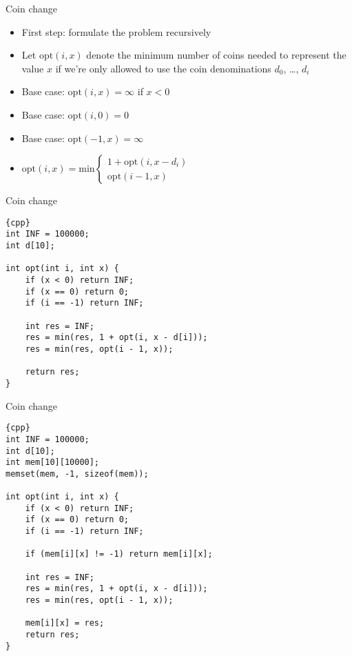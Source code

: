 \begin{frame}[fragile]{Coin change}
    \begin{itemize}
        \item First step: formulate the problem recursively
\item Let $\mathrm{opt}(i,x)$ denote the minimum number of coins needed to represent the value $x$ if we're only allowed to use the coin denominations $d_0$, \ldots, $d_i$
        \item Base case: $\mathrm{opt}(i,x) = \infty$ if $x < 0$
        \item Base case: $\mathrm{opt}(i,0) = 0$
        \item Base case: $\mathrm{opt}(-1,x) = \infty$
\item $\mathrm{opt}(i,x) = \mathrm{min} \left\{
	\begin{array}{l}
        1 + \mathrm{opt}(i, x - d_i) \\
        \mathrm{opt}(i-1, x)
	\end{array}
\right.$
    \end{itemize}
\end{frame}

\begin{frame}[fragile]{Coin change}
    \begin{lstlisting}[basicstyle=\footnotesize]{cpp}
int INF = 100000;
int d[10];

int opt(int i, int x) {
    if (x < 0) return INF;
    if (x == 0) return 0;
    if (i == -1) return INF;

    int res = INF;
    res = min(res, 1 + opt(i, x - d[i]));
    res = min(res, opt(i - 1, x));

    return res;
}
    \end{lstlisting}
\end{frame}

\begin{frame}[fragile]{Coin change}
    \begin{lstlisting}[basicstyle=\footnotesize]{cpp}
int INF = 100000;
int d[10];
int mem[10][10000];
memset(mem, -1, sizeof(mem));

int opt(int i, int x) {
    if (x < 0) return INF;
    if (x == 0) return 0;
    if (i == -1) return INF;

    if (mem[i][x] != -1) return mem[i][x];

    int res = INF;
    res = min(res, 1 + opt(i, x - d[i]));
    res = min(res, opt(i - 1, x));

    mem[i][x] = res;
    return res;
}
    \end{lstlisting}
\end{frame}

